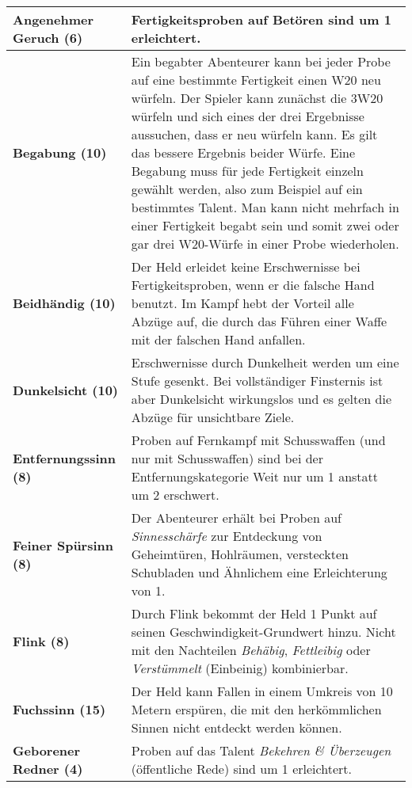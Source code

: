 \begin{longtable}{|p{5cm}|p{11cm}|}
\textbf{Angenehmer Geruch (6)} & Fertigkeitsproben auf Betören sind um 1 erleichtert. \\ \hline

\textbf{Begabung (10)} & Ein begabter Abenteurer kann bei jeder Probe auf eine bestimmte Fertigkeit einen W20 neu würfeln. Der Spieler kann zunächst die 3W20 würfeln und sich eines der drei Ergebnisse aussuchen, dass er neu würfeln kann. Es gilt das bessere Ergebnis beider Würfe. Eine Begabung muss für jede Fertigkeit einzeln gewählt werden, also zum Beispiel auf ein bestimmtes Talent. Man kann nicht mehrfach in einer Fertigkeit begabt sein und somit zwei oder gar drei W20-Würfe in einer Probe wiederholen. \\ \hline

\textbf{Beidhändig (10)} & Der Held erleidet keine Erschwernisse bei Fertigkeitsproben, wenn er die falsche Hand benutzt. Im Kampf hebt der Vorteil alle Abzüge auf, die durch das Führen einer Waffe mit der falschen Hand anfallen. \\ \hline

\textbf{Dunkelsicht (10)} & Erschwernisse durch Dunkelheit werden um eine Stufe gesenkt. Bei vollständiger Finsternis ist aber Dunkelsicht wirkungslos und es gelten die Abzüge für unsichtbare Ziele. \\ \hline

\textbf{Entfernungssinn (8)} & Proben auf Fernkampf mit Schusswaffen (und nur mit Schusswaffen) sind bei der Entfernungskategorie Weit nur um 1 anstatt um 2 erschwert. \\ \hline

\textbf{Feiner Spürsinn (8)} & Der Abenteurer erhält bei Proben auf \textit{Sinnesschärfe} zur Entdeckung von Geheimtüren, Hohlräumen, versteckten Schubladen und Ähnlichem eine Erleichterung von 1. \\ \hline

\textbf{Flink (8)} & Durch Flink bekommt der Held 1 Punkt auf seinen Geschwindigkeit-Grundwert hinzu. Nicht mit den Nachteilen \textit{Behäbig}, \textit{Fettleibig} oder \textit{Verstümmelt} (Einbeinig) kombinierbar. \\ \hline

\textbf{Fuchssinn (15)} & Der Held kann Fallen in einem Umkreis von 10 Metern erspüren, die mit den herkömmlichen Sinnen nicht entdeckt werden können. \\ \hline

\textbf{Geborener Redner (4)} & Proben auf das Talent \textit{Bekehren \& Überzeugen} (öffentliche Rede) sind um 1 erleichtert. \\ \hline


\end{longtable}
